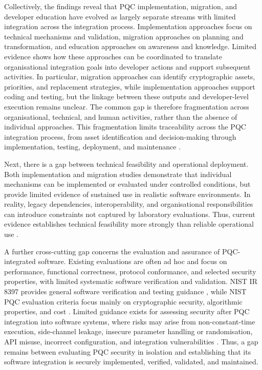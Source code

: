 \documentclass[letterpaper,twocolumn,10pt]{article}
\begin{document}
Collectively, the findings reveal that PQC implementation, migration, and developer education have evolved as largely separate streams with limited integration across the integration process. Implementation approaches focus on technical mechanisms and validation, migration approaches on planning and transformation, and education approaches on awareness and knowledge. Limited evidence shows how these approaches can be coordinated to translate organisational integration goals into developer actions and support subsequent activities. In particular, migration approaches can identify cryptographic assets, priorities, and replacement strategies, while implementation approaches support coding and testing, but the linkage between these outputs and developer-level execution remains unclear. The common gap is therefore fragmentation across organisational, technical, and human activities, rather than the absence of individual approaches. This fragmentation limits traceability across the PQC integration process, from asset identification and decision-making through implementation, testing, deployment, and maintenance \cite{Ana_MigFrDepen, Ana_MigFrameOrg, Ana_PMMP, Ana_decisionAlgo, naether_migrating_2024}.

Next, there is a gap between technical feasibility and operational deployment. Both implementation and migration studies demonstrate that individual mechanisms can be implemented or evaluated under controlled conditions, but provide limited evidence of sustained use in realistic software environments. In reality, legacy dependencies, interoperability, and organisational responsibilities can introduce constraints not captured by laboratory evaluations. Thus, current evidence establishes technical feasibility more strongly than reliable operational use \cite{nist_fips_203_2024, nist_fips_204_2024, nist_fips_205_2024}.

A further cross-cutting gap concerns the evaluation and assurance of PQC-integrated software. Existing evaluations are often ad hoc and focus on performance, functional correctness, protocol conformance, and selected security properties, with limited systematic software verification and validation. NIST IR 8397 provides general software verification and testing guidance \cite{nist_ir_8397_2021}, while NIST PQC evaluation criteria focus mainly on cryptographic security, algorithmic properties, and cost \cite{nist_pqc_cost_evaluation_criteria, nist_pqc_security_evaluation_criteria}. Limited guidance exists for assessing security after PQC integration into software systems, where risks may arise from non-constant-time execution, side-channel leakage, insecure parameter handling or randomisation, API misuse, incorrect configuration, and integration vulnerabilities \cite{toruan2026security, Ana_hekkala_implementing_2023}. Thus, a gap remains between evaluating PQC security in isolation and establishing that its software integration is securely implemented, verified, validated, and maintained.
\end{document}
